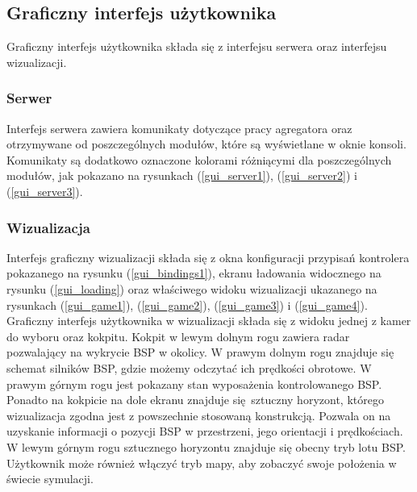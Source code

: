 \documentclass[15pt]{sprawozdanie}
\begin{document}
\newpage

\subsection{Graficzny interfejs użytkownika}

Graficzny interfejs użytkownika składa się z interfejsu serwera oraz interfejsu wizualizacji. 

\subsubsection*{Serwer}

Interfejs serwera zawiera komunikaty dotyczące pracy agregatora oraz otrzymywane od poszczególnych modułów, które są wyświetlane w oknie konsoli. Komunikaty są dodatkowo oznaczone kolorami różniącymi dla poszczególnych modułów, jak pokazano na rysunkach (\ref{gui_server1}), (\ref{gui_server2}) i (\ref{gui_server3}).

\subsubsection*{Wizualizacja}

Interfejs graficzny wizualizacji składa się z okna konfiguracji przypisań kontrolera pokazanego na rysunku (\ref{gui_bindings1}), ekranu ładowania widocznego na rysunku (\ref{gui_loading}) oraz właściwego widoku wizualizacji ukazanego na rysunkach (\ref{gui_game1}), (\ref{gui_game2}), (\ref{gui_game3}) i (\ref{gui_game4}). \\

Graficzny interfejs użytkownika w wizualizacji składa się z widoku jednej z kamer do wyboru oraz kokpitu. Kokpit w lewym dolnym rogu zawiera radar pozwalający na wykrycie BSP w okolicy. W prawym dolnym rogu znajduje się schemat silników BSP, gdzie możemy odczytać ich prędkości obrotowe. W prawym górnym rogu jest pokazany stan wyposażenia kontrolowanego BSP. Ponadto na kokpicie na dole ekranu znajduje się sztuczny horyzont, którego wizualizacja zgodna jest z powszechnie stosowaną konstrukcją. Pozwala on na uzyskanie informacji o pozycji BSP w przestrzeni, jego orientacji i prędkościach. W lewym górnym rogu sztucznego horyzontu znajduje się obecny tryb lotu BSP. Użytkownik może również włączyć tryb mapy, aby zobaczyć swoje położenia w świecie symulacji.
\end{document}
